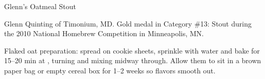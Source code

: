 \begin{recipe}{Glenn's Oatmeal Stout}

\begin{aboutblock}
Glenn Quinting of Timonium, MD. Gold medal in Category \#13: Stout during the
2010 National Homebrew Competition in Minneapolis, MN. \sourceaha
\end{aboutblock}


\begin{methodandtiming}

\begin{mashsteps}
\end{mashsteps}

\begin{fermentationsteps}
\end{fermentationsteps}

\begin{directions}
Flaked oat preparation: spread on cookie sheets, sprinkle with water and bake for 15--20
min at , turning and mixing midway through. Allow them to sit in a brown paper bag
or empty cereal box for 1--2 weeks so flavors smooth out. 
\end{directions}

\end{methodandtiming}

\recipebreak

\begin{ingredientsblock}

\begin{malts}
\end{malts}

\begin{hops}
\end{hops}


\end{ingredientsblock}

\end{recipe}

